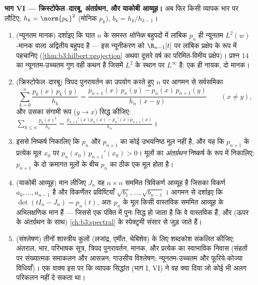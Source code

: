 \begin{problem}
\medskip
\noindent\textbf{भाग VI --- क्रिस्टोफेल--दारबू, अंतर्ग्रथन, और
याकोबी आव्यूह।} अब फिर किसी व्यापक भार पर लौटिए; $h_k = \norm{p_k}^2$ (मोनिक
$p_k$), $b_k = h_k/h_{k-1}$।
\begin{enumerate}[resume]
  \item (न्यूनतम मानक) दर्शाइए कि घात $n$ के समस्त \emph{मोनिक}
        बहुपदों में लांबिक $p_n$ ही न्यूनतम $L^2(w)$-मानक वाला
        अद्वितीय बहुपद है --- इस न्यूनीकरण को $\R_{n-1}[t]$ पर लांबिक
        प्रक्षेप के रूप में पहचानिए (\cref{thm:b3:hilbert:projection} अथवा दूसरे वर्ष का
        परिमित-विमीय प्रक्षेप)। प्रश्न 14 का न्यूनतम-उच्चतम गुण
        वही कथन है जिसमें $L^2$ के स्थान पर $L^\infty$ है: एक ही नायक,
        दो मानक।
  \item (क्रिस्टोफेल--दारबू) त्रिपद पुनरावर्तन का उपयोग करते हुए
        $n$ पर आगमन से सर्वसमिका
        \[
        \sum_{k=0}^{n}\frac{p_k(x)\,p_k(y)}{h_k}
        = \frac{p_{n+1}(x)\,p_n(y) -
        p_n(x)\,p_{n+1}(y)}{h_n\,(x - y)}
        \qquad (x \neq y),
        \]
        और उसका संगामी रूप ($y \to x$) सिद्ध कीजिए:
        $\sum_{k\leq n}\frac{p_k(x)^2}{h_k} =
        \frac{p_{n+1}'(x)p_n(x) - p_n'(x)p_{n+1}(x)}{h_n}$।
  \item इससे निष्कर्ष निकालिए कि $p_n$ और $p_{n+1}$ का कोई उभयनिष्ठ
        मूल नहीं है, और यह कि $p_{n+1}$ के प्रत्येक मूल $x_0$ पर
        $p_n(x_0)\,p_{n+1}'(x_0) > 0$। मूलों का \emph{अंतर्ग्रथन} निष्कर्ष के रूप में
        निकालिए: $p_{n+1}$ के दो क्रमागत मूलों के बीच $p_n$ का ठीक एक
        मूल होता है।
  \item (याकोबी आव्यूह) मान लीजिए $J_n$ वह $n\times n$ सममित त्रिविकर्ण
        आव्यूह है जिसका विकर्ण $a_0,
        \dots, a_{n-1}$ है और विकर्णेतर प्रविष्टियाँ
        $\sqrt{b_1},
        \dots, \sqrt{b_{n-1}}$। आगमन से दर्शाइए कि $\det(tI_n - J_n) = p_n(t)$, अतः $p_n$ के मूल किसी
        वास्तविक सममित आव्यूह के अभिलक्षणिक मान हैं --- जिससे एक
        पंक्ति में पुनः सिद्ध हो जाता है कि वे वास्तविक हैं, और
        (ऊपर के अंतर्ग्रथन के साथ)  \cref{ch:b3:spectral} के
        स्पेक्ट्रमी संसार से जुड़ जाते हैं।
  \item (संश्लेषण) तीनों शास्त्रीय कुलों (लजांद्र, एर्मीत,
        चेबिशेव) के लिए शब्दकोश संकलित कीजिए: अंतराल, भार,
        परिभाषक सूत्र, त्रिपद पुनरावर्तन, मानक, और प्रत्येक का
        स्वाभाविक निवास (संहतों पर संख्यात्मक समाकलन और आसन्नन;
        गाउसीय विश्लेषण; न्यूनतम-उच्चतम और फूरिये-कोज्या विधियाँ)।
        एक वाक्य इस पर कि व्यापक सिद्धांत (भाग I, VI) ने वह क्या
        दिया जो कोई भी अलग परिकलन नहीं दे सकता था।
\end{enumerate}


\end{problem}
